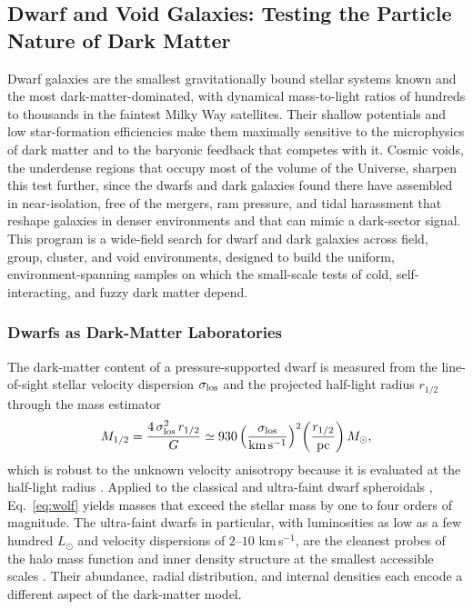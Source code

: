 \documentclass[10pt,onecolumn]{article}
\begin{document}
\subsection{Dwarf and Void Galaxies: Testing the Particle Nature of Dark Matter}\label{sec:dwarfvoid}

Dwarf galaxies are the smallest gravitationally bound stellar systems known and the most dark-matter-dominated, with dynamical mass-to-light ratios of hundreds to thousands in the faintest Milky Way satellites. Their shallow potentials and low star-formation efficiencies make them maximally sensitive to the microphysics of dark matter and to the baryonic feedback that competes with it. Cosmic voids, the underdense regions that occupy most of the volume of the Universe, sharpen this test further, since the dwarfs and dark galaxies found there have assembled in near-isolation, free of the mergers, ram pressure, and tidal harassment that reshape galaxies in denser environments and that can mimic a dark-sector signal. This program is a wide-field search for dwarf and dark galaxies across field, group, cluster, and void environments, designed to build the uniform, environment-spanning samples on which the small-scale tests of cold, self-interacting, and fuzzy dark matter depend.

\subsubsection{Dwarfs as Dark-Matter Laboratories}

The dark-matter content of a pressure-supported dwarf is measured from the line-of-sight stellar velocity dispersion $\sigma_{\rm los}$ and the projected half-light radius $r_{1/2}$ through the mass estimator
\begin{equation}
M_{1/2}=\frac{4\,\sigma_{\rm los}^2\,r_{1/2}}{G}\simeq930\left(\frac{\sigma_{\rm los}}{\rm km\,s^{-1}}\right)^{2}\!\left(\frac{r_{1/2}}{\rm pc}\right)M_\odot,
\label{eq:wolf}
\end{equation}
which is robust to the unknown velocity anisotropy because it is evaluated at the half-light radius \cite{wolf2010}. Applied to the classical and ultra-faint dwarf spheroidals \cite{mateo1998}, Eq.~\eqref{eq:wolf} yields masses that exceed the stellar mass by one to four orders of magnitude. The ultra-faint dwarfs in particular, with luminosities as low as a few hundred $L_\odot$ and velocity dispersions of $2$--$10$ km\,s$^{-1}$, are the cleanest probes of the halo mass function and inner density structure at the smallest accessible scales \cite{simon2019}. Their abundance, radial distribution, and internal densities each encode a different aspect of the dark-matter model.
\end{document}
